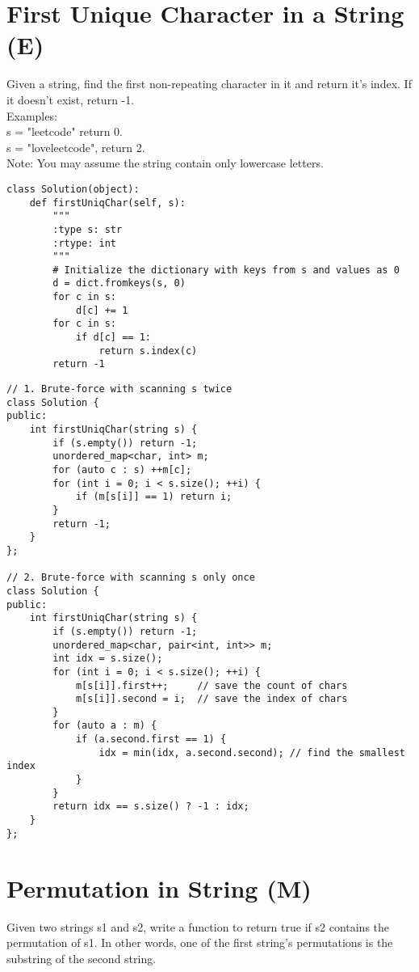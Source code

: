 \section{First Unique Character in a String (E)}
Given a string, find the first non-repeating character in it and return it's index. If it doesn't exist, return -1.\\

Examples:\\
s = "leetcode"
return 0.\\
s = "loveleetcode",
return 2.\\

Note: You may assume the string contain only lowercase letters. \\

\begin{lstlisting}
class Solution(object):
    def firstUniqChar(self, s):
        """
        :type s: str
        :rtype: int
        """
        # Initialize the dictionary with keys from s and values as 0
        d = dict.fromkeys(s, 0)
        for c in s:
            d[c] += 1
        for c in s:
            if d[c] == 1:
                return s.index(c)
        return -1
\end{lstlisting}
        

\begin{lstlisting}
// 1. Brute-force with scanning s twice
class Solution {
public:
    int firstUniqChar(string s) {
        if (s.empty()) return -1;
        unordered_map<char, int> m;
        for (auto c : s) ++m[c];
        for (int i = 0; i < s.size(); ++i) {
            if (m[s[i]] == 1) return i;
        }
        return -1;
    }
};

// 2. Brute-force with scanning s only once
class Solution {
public:
    int firstUniqChar(string s) {
        if (s.empty()) return -1;
        unordered_map<char, pair<int, int>> m;
        int idx = s.size();
        for (int i = 0; i < s.size(); ++i) {
            m[s[i]].first++;     // save the count of chars
            m[s[i]].second = i;  // save the index of chars
        }
        for (auto a : m) {
            if (a.second.first == 1) {
                idx = min(idx, a.second.second); // find the smallest index
            }
        }
        return idx == s.size() ? -1 : idx;
    }
};
\end{lstlisting}

\section{Permutation in String (M)}
Given two strings s1 and s2, write a function to return true if s2 contains the permutation of s1. In other words, one of the first string's permutations is the substring of the second string.

